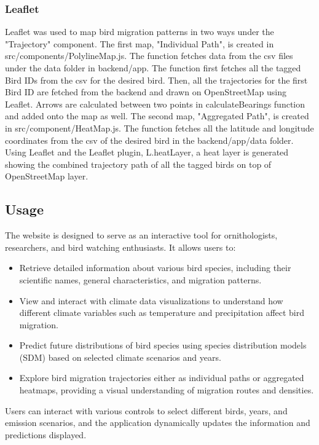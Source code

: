 \documentclass{article}
\begin{document}
\subsubsection*{Leaflet}
Leaflet was used to map bird migration patterns in two ways under the "Trajectory" component. The first map, "Individual Path", is created in src/components/PolylineMap.js.
The function fetches data from the csv files under the data folder in backend/app. The function first fetches all the tagged Bird IDs from the csv for the desired bird. Then,
all the trajectories for the first Bird ID are fetched from the backend and drawn on OpenStreetMap using Leaflet.  Arrows are calculated between two points in calculateBearings 
function and added onto the map as well. 
The second map, "Aggregated Path", is created in src/component/HeatMap.js. The function fetches all the latitude and longitude coordinates from the csv of the desired bird in 
the backend/app/data folder. Using Leaflet and the Leaflet plugin, L.heatLayer, a heat layer is generated showing the combined trajectory path of all the tagged birds on top of 
OpenStreetMap layer.  

\subsection{Usage}
The website is designed to serve as an interactive tool for ornithologists, researchers, and bird watching enthusiasts. It allows users to:

\begin{itemize}
    \item Retrieve detailed information about various bird species, including their scientific names, general characteristics, and migration patterns.
    \item View and interact with climate data visualizations to understand how different climate variables such as temperature and precipitation affect bird migration.
    \item Predict future distributions of bird species using species distribution models (SDM) based on selected climate scenarios and years.
    \item Explore bird migration trajectories either as individual paths or aggregated heatmaps, providing a visual understanding of migration routes and densities.
\end{itemize}

Users can interact with various controls to select different birds, years, and emission scenarios, and the application dynamically updates the information and predictions displayed.
\end{document}
